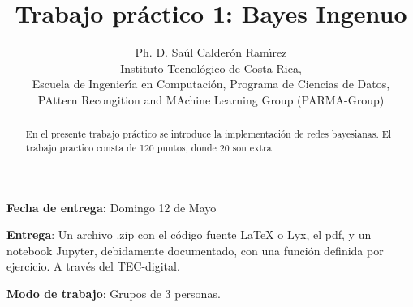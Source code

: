 \documentclass[spanish]{article}
\begin{document}
\title{Trabajo pr\'{a}ctico 1: Bayes Ingenuo}
\author{Ph. D. Sa\'{u}l Calder\'{o}n Ram\'{\i}rez \\
Instituto Tecnol\'{o}gico de Costa Rica, \\
Escuela de Ingenier\'{\i}a en Computaci\'{o}n, Programa de Ciencias
de Datos,\\
PAttern Recongition and MAchine Learning Group (PARMA-Group)}

\maketitle
\textbf{Fecha de entrega:} Domingo 12 de Mayo

\textbf{Entrega}: Un archivo .zip con el c\'{o}digo fuente LaTeX o
Lyx, el pdf, y un notebook Jupyter, debidamente documentado, con una
funci\'{o}n definida por ejercicio. A trav\'{e}s del TEC-digital.

\textbf{Modo de trabajo}: Grupos de 3 personas.
\begin{abstract}
En el presente trabajo pr\'{a}ctico se introduce la implementaci\'{o}n
de redes bayesianas. El trabajo practico consta de 120 puntos, donde
20 son extra.
\end{abstract}
\end{document}
